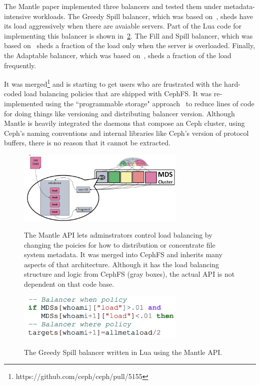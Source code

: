 The Mantle paper implemented three balancers and tested them under
metadata-intensive workloads. The Greedy Spill balancer, which was based
on~\cite{patil:fast2011-giga+}, sheds have its load aggressively when there are
avaiable servers. Part of the Lua code for implementing this balancer is shown
in~\ref{fig:arch-mantle-example}.  The Fill and Spill balancer, which was based
on~\cite{pai:asplos1998-lard} sheds a fraction of the load only when the server
is overloaded. Finally, the Adaptable balancer, which was based
on~\cite{weil:sc2004-dyn-metadata, weil:osdi2006-ceph}, sheds a fraction of the
load frequently.

It was merged\footnote{https://github.com/ceph/ceph/pull/5155} and is starting
to get users who are frustrated with the hard-coded load balancing policies
that are shipped with CephFS. It was re-implemented using the ``programmable
storage" approach~\cite{sevilla:eurosys17} to reduce lines of code for doing
things like versioning and distributing balancer version.  Although Mantle is
heavily integrated the daemons that compose an Ceph cluster, using Ceph's
naming conventions and internal libraries like Ceph's version of protocol
buffers, there is no reason that it cannot be extracted.

\begin{figure}[tb]
  \noindent\includegraphics[width=19pc,angle=0]{figures/arch-mantle.png}\\
  \caption{The Mantle API lets adminstrators control load balancing by
  changing the poicies for how to distribution or concentrate file system
  metadata. It was merged into CephFS and inherits many aspects of that
  architecture. Although it has the load balancing structure and logic from
  CephFS (gray boxes), the actual API is not dependent on that code base.}
  \label{fig:arch-mantle}
\end{figure}
\begin{figure}[tb]
  \noindent\includegraphics[width=19pc,angle=0]{figures/arch-mantle-example.png}\\
  \caption{The Greedy Spill balancer written in Lua using the Mantle API.}
  \label{fig:arch-mantle-example}
\end{figure}

